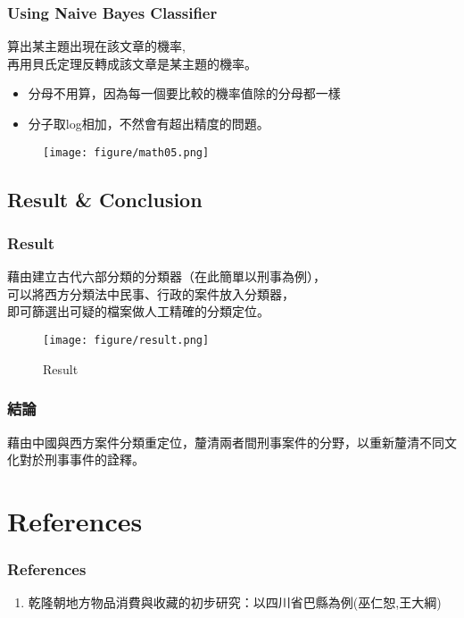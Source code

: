 \documentclass{beamer}
\begin{document}
\begin{frame}
    \frametitle{Using Naive Bayes Classifier}
    算出某主題出現在該文章的機率,\\再用貝氏定理反轉成該文章是某主題的機率。
    \begin{itemize}
        \item 分母不用算，因為每一個要比較的機率值除的分母都一樣
        \item 分子取log相加，不然會有超出精度的問題。
    \end{itemize}
    \begin{figure}[H]
    	\begin{center}
        	\texttt{[image: figure/math05.png]}
    	\end{center}
	\end{figure}
\end{frame}

\subsection{Result \& Conclusion}
\begin{frame}
    \frametitle{Result}
    藉由建立古代六部分類的分類器（在此簡單以刑事為例），\\
    可以將西方分類法中民事、行政的案件放入分類器，\\即可篩選出可疑的檔案做人工精確的分類定位。
    \begin{figure}[H]
    	\begin{center}
        	\texttt{[image: figure/result.png]}
			\caption{Result}
    	\end{center}
	\end{figure}
\end{frame}
\begin{frame}
    \frametitle{結論}
    藉由中國與西方案件分類重定位，釐清兩者間刑事案件的分野，以重新釐清不同文化對於刑事事件的詮釋。
\end{frame}





\section{References}
\begin{frame}
	\frametitle{References}
	\begin{enumerate}
		\item 乾隆朝地方物品消費與收藏的初步研究：以四川省巴縣為例(巫仁恕,王大綱)
	\end{enumerate}
\end{frame}
\end{document}
